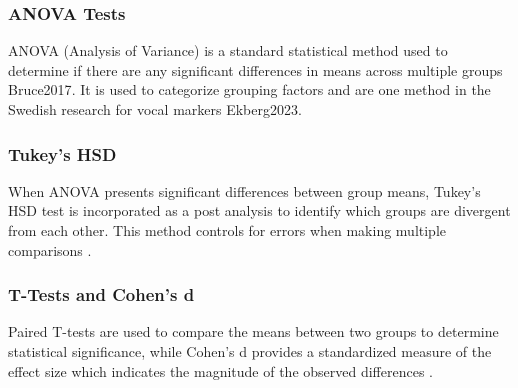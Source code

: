 \subsubsection{ANOVA Tests}
ANOVA (Analysis of Variance) is a standard statistical method used to determine if there are any significant differences in means across multiple groups {Bruce2017}. It is used to categorize grouping factors and are one method in the Swedish research for vocal markers {Ekberg2023}.  

\subsubsection{Tukey's HSD}
When ANOVA presents significant differences between group means, Tukey's HSD test is incorporated as a post analysis to identify which groups are divergent from each other. 
This method controls for errors when making multiple comparisons \autocite{Bruce2017}. 
\subsubsection{T-Tests and Cohen's d}
Paired T-tests are used to compare the means between two groups to determine statistical significance, while Cohen's d provides a standardized measure of the effect size which indicates the magnitude of the observed differences \autocite{Cohen1977} \autocite{Bruce2017}.